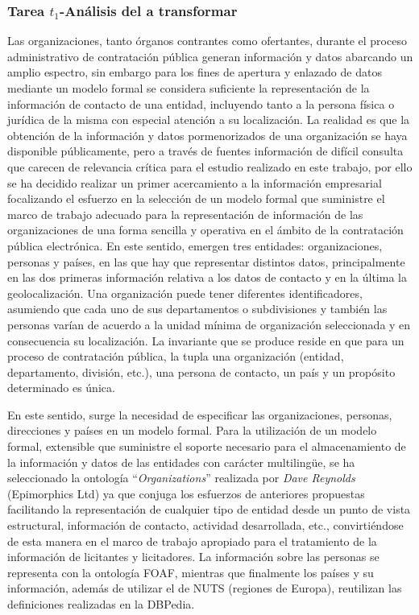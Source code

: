 \subsubsection{Tarea $t_1$-Análisis del \dataset a transformar}\label{t1-orgs}
Las organizaciones, tanto órganos contrantes como ofertantes, durante el proceso administrativo de 
contratación pública generan información y datos abarcando un amplio espectro, sin embargo para los fines 
de apertura y enlazado de datos mediante un modelo formal se considera 
suficiente la representación de la información de contacto de una entidad, 
incluyendo tanto a la persona física o jurídica de la misma con especial atención a su localización. La realidad 
es que la obtención de la información y datos pormenorizados de una organización se haya disponible públicamente, 
pero a través de fuentes información de difícil consulta que carecen de relevancia crítica para el estudio realizado en este trabajo, 
por ello se ha decidido realizar un primer acercamiento a la información empresarial focalizando el esfuerzo en la selección 
de un modelo formal que suministre el marco de trabajo adecuado para la representación de información 
de las organizaciones de una forma sencilla y operativa en el ámbito de la contratación pública 
electrónica. En este sentido, emergen tres entidades: organizaciones, personas y países, en las que 
hay que representar distintos datos, principalmente en las dos primeras información relativa a los datos de contacto y en la última 
la geolocalización. Una organización puede tener diferentes identificadores, asumiendo que cada uno de sus departamentos o 
subdivisiones y también las personas varían de acuerdo a la unidad mínima de organización seleccionada 
y en consecuencia su localización. La invariante que se produce reside en que para un proceso de contratación pública, la tupla 
una organización (entidad, departamento, división, etc.), una persona de contacto, un país y un propósito determinado es única.

En este sentido, surge la necesidad de especificar las organizaciones, personas, direcciones y países en un modelo formal. Para 
la utilización de un modelo formal, extensible que suministre el soporte necesario para el almacenamiento de la información y datos de las entidades con carácter 
multiling\"{u}e, se ha seleccionado la ontología ``\textit{Organizations}'' realizada por \textit{Dave Reynolds} (Epimorphics Ltd) ya que conjuga 
los esfuerzos de anteriores propuestas facilitando la representación de cualquier tipo de entidad desde un punto de vista 
estructural, información de contacto, actividad desarrollada, etc., convirtiéndose de esta manera en el marco de trabajo 
apropiado para el tratamiento de la información de licitantes y licitadores. La información sobre las personas se representa con la ontología 
FOAF, mientras que finalmente los países y su información, además de utilizar el \dataset de NUTS (regiones de Europa), reutilizan 
las definiciones realizadas en la DBPedia. 


